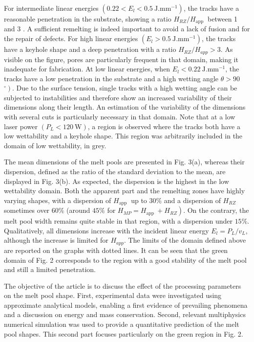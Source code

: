 \documentclass[10pt]{article}
\begin{document}
For intermediate linear energies $\left(0.22<E_{l}<0.5 \mathrm{~J} . \mathrm{mm}^{-1}\right)$, the tracks have a reasonable penetration in the substrate, showing a ratio $H_{R Z} / H_{\text {app }}$ between 1 and 3 . A sufficient remelting is indeed important to avoid a lack of fusion and for the repair of defects. For high linear energies $\left(E_{l}>0.5 \mathrm{~J} . \mathrm{mm}^{-1}\right)$, the tracks have a keyhole shape and a deep penetration with a ratio $H_{R Z} / H_{a p p}>3$. As visible on the figure, pores are particularly frequent in that domain, making it inadequate for fabrication. At low linear energies, when $E_{l}<0.22 \mathrm{~J} . \mathrm{mm}^{-1}$, the tracks have a low penetration in the substrate and a high wetting angle $\theta>90$ $\left.{ }^{\circ}\right)$. Due to the surface tension, single tracks with a high wetting angle can be subjected to instabilities and therefore show an increased variability of their dimensions along their length. An estimation of the variability of the dimensions with several cuts is particularly necessary in that domain. Note that at a low laser power $\left(P_{L}<120 \mathrm{~W}\right)$, a region is observed where the tracks both have a low wettability and a keyhole shape. This region was arbitrarily included in the domain of low wettability, in grey.

The mean dimensions of the melt pools are presented in Fig. 3(a), whereas their dispersion, defined as the ratio of the standard deviation to the mean, are displayed in Fig. 3(b). As expected, the dispersion is the highest in the low wettability domain. Both the apparent part and the remelting zones have highly varying shapes, with a dispersion of $H_{\text {app }}$ up to $30 \%$ and a dispersion of $H_{R Z}$ sometimes over $60 \%$ (around $45 \%$ for $\left.H_{M P}=H_{\text {app }}+H_{R Z}\right)$. On the contrary, the melt pool width remains quite stable in that region, with a dispersion under $15 \%$. Qualitatively, all dimensions increase with the incident linear energy $E_{l}=P_{L} / v_{L}$, although the increase is limited for $H_{a p p}$. The limits of the domain defined above are reported on the graphs with dotted lines. It can be seen that the green domain of Fig. 2 corresponds to the region with a good stability of the melt pool and still a limited penetration.

The objective of the article is to discuss the effect of the processing parameters on the melt pool shape. First, experimental data were investigated using approximate analytical models, enabling a first evidence of prevailing phenomena and a discussion on energy and mass conservation. Second, relevant multiphysics numerical simulation was used to provide a quantitative prediction of the melt pool shapes. This second part focuses particularly on the green region in Fig. 2.
\end{document}
